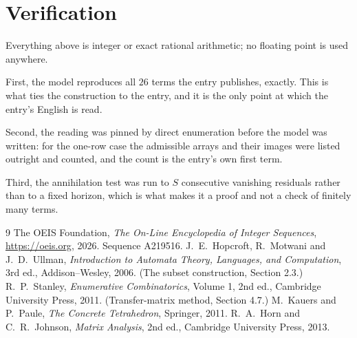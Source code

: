 \documentclass[11pt,a4paper]{article}
\theoremstyle{plain}
\theoremstyle{definition}
\begin{document}
\section{Verification}

Everything above is integer or exact rational arithmetic; no floating point is used anywhere.

First, the model reproduces all $26$ terms the entry publishes, exactly. This is what
ties the construction to the entry, and it is the only point at which the entry's English is
read.

Second, the reading was pinned by direct enumeration before the model was written: for the
one-row case the admissible arrays and their images were listed outright and counted, and the
count is the entry's own first term.

Third, the annihilation test was run to $S$ consecutive vanishing residuals rather than to a
fixed horizon, which is what makes it a proof and not a check of finitely many terms.

\begin{thebibliography}{9}
 The OEIS Foundation, \emph{The On-Line Encyclopedia of Integer
Sequences}, \url{https://oeis.org}, 2026. Sequence A219516.
 J.~E.~Hopcroft, R.~Motwani and J.~D.~Ullman, \emph{Introduction to Automata
Theory, Languages, and Computation}, 3rd ed., Addison--Wesley, 2006. (The subset
construction, Section 2.3.)
 R.~P.~Stanley, \emph{Enumerative Combinatorics}, Volume 1, 2nd ed.,
Cambridge University Press, 2011. (Transfer-matrix method, Section 4.7.)
 M.~Kauers and P.~Paule, \emph{The Concrete Tetrahedron}, Springer, 2011.
 R.~A.~Horn and C.~R.~Johnson, \emph{Matrix Analysis}, 2nd ed., Cambridge
University Press, 2013.
\end{thebibliography}
\end{document}
